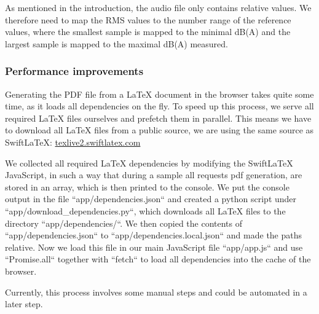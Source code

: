 As mentioned in the introduction, the audio file only contains relative values.
We therefore need to map the RMS values to the number range of the reference values, where the smallest sample is mapped to the minimal dB(A) and the largest sample is mapped to the maximal dB(A) measured.

\subsubsection{Performance improvements}
Generating the PDF file from a LaTeX document in the browser takes quite some time, as it loads all dependencies
on the fly.
To speed up this process, we serve all required LaTeX files ourselves and prefetch them in parallel.
This means we have to download all LaTeX files from a public source, we are using the same source as SwiftLaTeX:
\href{https://texlive2.swiftlatex.com/}{texlive2.swiftlatex.com}

We collected all required LaTeX dependencies by modifying the SwiftLaTeX JavaScript, in such a way that during a sample
all requests pdf generation, are stored in an array, which is then printed to the console.
We put the console output in the file ``app/dependencies.json`` and created a python script under ``app/download\_dependencies.py``,
which downloads all LaTeX files to the directory ``app/dependencies/``.
We then copied the contents of ``app/dependencies.json`` to ``app/dependencies.local.json`` and made the paths relative.
Now we load this file in our main JavaScript file ``app/app.js`` and use ``Promise.all`` together with ``fetch`` to load
all dependencies into the cache of the browser.

Currently, this process involves some manual steps and could be automated in a later step.